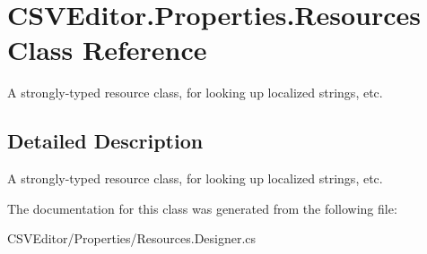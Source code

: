 \hypertarget{class_c_s_v_editor_1_1_properties_1_1_resources}{}\section{C\+S\+V\+Editor.\+Properties.\+Resources Class Reference}
\label{class_c_s_v_editor_1_1_properties_1_1_resources}


A strongly-\/typed resource class, for looking up localized strings, etc.  




\subsection{Detailed Description}
A strongly-\/typed resource class, for looking up localized strings, etc. 



The documentation for this class was generated from the following file\+:\begin{DoxyCompactItemize}
\item 
C\+S\+V\+Editor/\+Properties/Resources.\+Designer.\+cs\end{DoxyCompactItemize}
